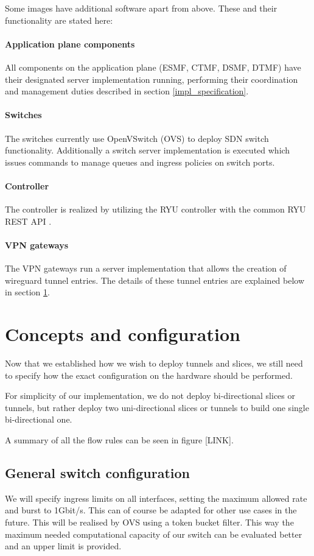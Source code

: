 Some images have additional software apart from above. These and their functionality are stated here:
\paragraph{Application plane components} All components on the application plane (ESMF, CTMF, DSMF, DTMF) have their designated server implementation running, performing their coordination and management duties described in section \ref{impl_specification}.
\paragraph{Switches} The switches currently use OpenVSwitch (OVS) \cite{openvswitch} to deploy SDN switch functionality. Additionally a switch server implementation is executed which issues commands to manage queues and ingress policies on switch ports.
\paragraph{Controller} The controller is realized by utilizing the RYU controller \cite{ryu} with the common RYU REST API \cite{ryu-rest}.
\paragraph{VPN gateways} The VPN gateways run a server implementation that allows the creation of wireguard \cite{wireguard} tunnel entries. The details of these tunnel entries are explained below in section \ref{impl_concepts}.


\section{Concepts and configuration}
\label{impl_concepts}
Now that we established how we wish to deploy tunnels and slices, we still need to specify how the exact configuration on the hardware should be performed.

For simplicity of our implementation, we do not deploy bi-directional slices or tunnels, but rather deploy two uni-directional slices or tunnels to build one single bi-directional one.

A summary of all the flow rules can be seen in figure [LINK].

\subsection{General switch configuration}
We will specify ingress limits on all interfaces, setting the maximum allowed rate and burst to 1Gbit/s. This can of course be adapted for other use cases in the future. This will be realised by OVS using a token bucket filter. This way the maximum needed computational capacity of our switch can be evaluated better and an upper limit is provided.

